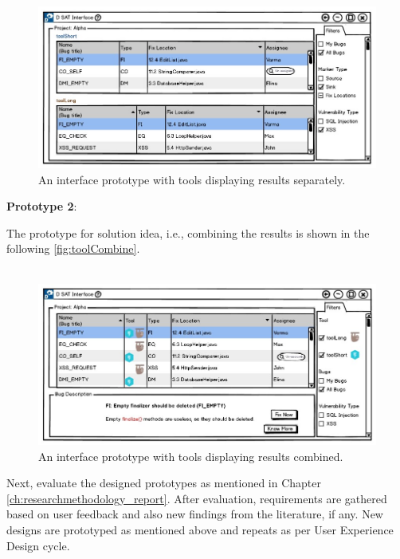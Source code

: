 \begin{figure}[hbt!]
	\centering
	\includegraphics[width=\linewidth]{figures/d_seperate}
	\caption{An interface prototype with tools displaying results separately.}
	\label{fig:toolSeperate}
\end{figure}

\textbf{Prototype 2}:

The prototype for solution idea, i.e., combining the results is shown in the following \autoref{fig:toolCombine}. \\ \\

\begin{figure}[hbt!]
	\centering
	\includegraphics[width=\linewidth]{figures/d_combine}
	\caption{An interface prototype with tools displaying results combined.}
	\label{fig:toolCombine}
\end{figure}

\clearpage

Next, evaluate the designed prototypes as mentioned in Chapter \ref{ch:researchmethodology_report}. After evaluation, requirements are gathered based on user feedback and also new findings from the literature, if any. New designs are prototyped as mentioned above and repeats as per User Experience Design cycle. \\ \\

